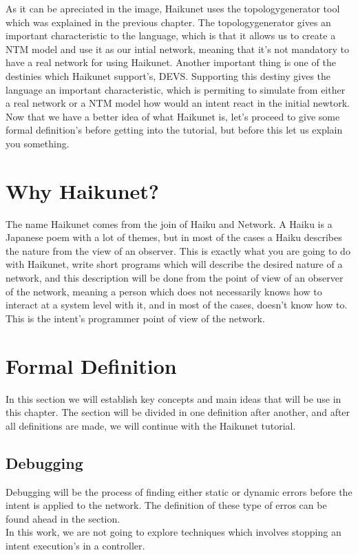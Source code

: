 As it can be apreciated in the image, Haikunet uses the topologygenerator tool which was explained in the previous chapter. The topologygenerator gives an important characteristic to the language, which is that it allows us to create a NTM model and use it as our intial network, meaning that it's not mandatory to have a real network for using Haikunet. Another important thing is one of the destinies which Haikunet support's, DEVS. Supporting this destiny gives the language an important characteristic, which is permiting to simulate from either a real network or a NTM model how would an intent react in the initial newtork.\\

Now that we have a better idea of what Haikunet is, let's proceed to give some formal definition's before getting into the tutorial, but before this let us explain you something.

\section{Why Haikunet?}

The name Haikunet comes from the join of Haiku and Network. A Haiku is a Japanese poem with a lot of themes, but in most of the cases a Haiku describes the nature from the view of an observer. This is exactly what you are going to do with Haikunet, write short programs which will describe the desired nature of a network, and this description will be done from the point of view of an observer of the network, meaning a person which does not necessarily knows how to interact at a system level with it, and in most of the cases, doesn't know how to. This is the intent's programmer point of view of the network. 

\section{Formal Definition}

In this section we will establish key concepts and main ideas that will be use in this chapter. The section will be divided in one definition after another, and after all definitions are made, we will continue with the Haikunet tutorial.\\

\subsection{Debugging}

Debugging will be the process of finding either static or dynamic errors before the intent is applied to the network. The definition of these type of erros can be found ahead in the section.\\
In this work, we are not going to explore techniques which involves stopping an intent execution's in a controller. 

